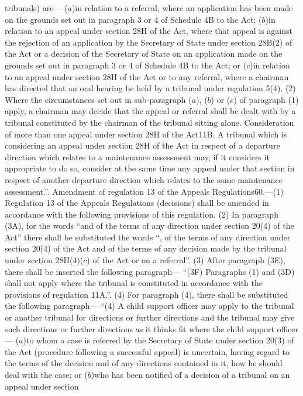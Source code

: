\documentclass[a4paper]{article}
\begin{document}
tribunals) are—
($a$)in relation to a referral, where an application has been made on the grounds
set out in paragraph 3 or 4 of Schedule 4B to the Act;
($b$)in relation to an appeal under section 28H of the Act, where that appeal is
against the rejection of an application by the Secretary of State under section
28B(2) of the Act or a decision of the Secretary of State on an application made
on the grounds set out in paragraph 3 or 4 of Schedule 4B to the Act; or
($c$)in relation to an appeal under section 28H of the Act or to any referral,
where a chairman has directed that an oral hearing be held by a tribunal under
regulation 5(4).
(2) Where the circumstances set out in sub-paragraph ($a$), ($b$) or ($c$) of
paragraph (1) apply, a chairman may decide that the appeal or referral shall be
dealt with by a tribunal constituted by the chairman of the tribunal sitting
alone.
Consideration of more than one appeal under section 28H of the Act11B. A
tribunal which is considering an appeal under section 28H of the Act in respect
of a departure direction which relates to a maintenance assessment may, if it
considers it appropriate to do so, consider at the same time any appeal under
that section in respect of another departure direction which relates to the same
maintenance assessment.”.
Amendment of regulation 13 of the Appeals Regulations60.—(1) Regulation 13 of
the Appeals Regulations (decisions) shall be amended in accordance with the
following provisions of this regulation.
(2) In paragraph (3A), for the words “and of the terms of any direction under
section 20(4) of the Act” there shall be substituted the words “, of the terms
of any direction under section 20(4) of the Act and of the terms of any decision
made by the tribunal under section 28H(4)($c$) of the Act or on a referral”.
(3) After paragraph (3E), there shall be inserted the following paragraph—
“(3F) Paragraphs (1) and (3D) shall not apply where the tribunal is constituted
in accordance with the provisions of regulation 11A.”.
(4) For paragraph (4), there shall be substituted the following paragraph—
“(4) A child support officer may apply to the tribunal or another tribunal for
directions or further directions and the tribunal may give such directions or
further directions as it thinks fit where the child support officer—
($a$)to whom a case is referred by the Secretary of State under section 20(3) of
the Act (procedure following a successful appeal) is uncertain, having regard to
the terms of the decision and of any directions contained in it, how he should
deal with the case; or
($b$)who has been notified of a decision of a tribunal on an appeal under section
\end{document}
